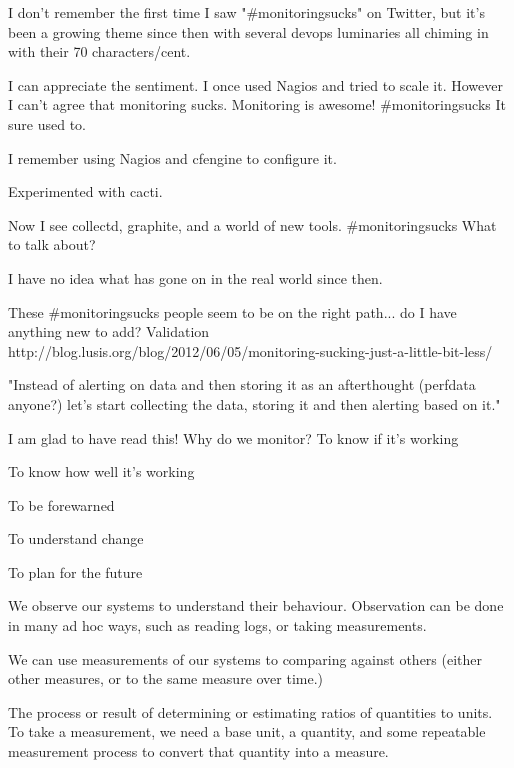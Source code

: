 \documentclass[online,helvetica]{chaksem}
\begin{document}
\begin{slide}

\end{slide}




I don't remember the first time I saw "#monitoringsucks" on Twitter, but it's
been a growing theme since then with several devops luminaries all chiming in
with their 70 characters/cent.

I can appreciate the sentiment.  I once used Nagios and tried to scale it.
However I can't agree that monitoring sucks.   Monitoring is awesome!
#monitoringsucks
It sure used to.

I remember using Nagios and cfengine to configure it.

Experimented with cacti.

Now I see collectd, graphite, and a world of new tools.
#monitoringsucks
What to talk about?

I have no idea what has gone on in the real world since then.

These #monitoringsucks people seem to be on the right path... do I have anything new to add?
Validation
http://blog.lusis.org/blog/2012/06/05/monitoring-sucking-just-a-little-bit-less/

"Instead of alerting on data and then storing it as an afterthought (perfdata anyone?) let’s start collecting the
data, storing it and then alerting based on it."


I am glad to have read this!
Why do we monitor?
To know if it's working

To know how well it's working

To be forewarned

To understand change

To plan for the future

We observe our systems to understand their behaviour.  Observation can be done
in many ad hoc ways, such as reading logs, or taking measurements.

We can use measurements of our systems to comparing against others (either other measures, or to the same measure over time.)

The process or result of determining or estimating ratios of quantities to
units.  To take a measurement, we need a base unit, a quantity, and some
repeatable measurement process to convert that quantity into a measure.
\end{document}
